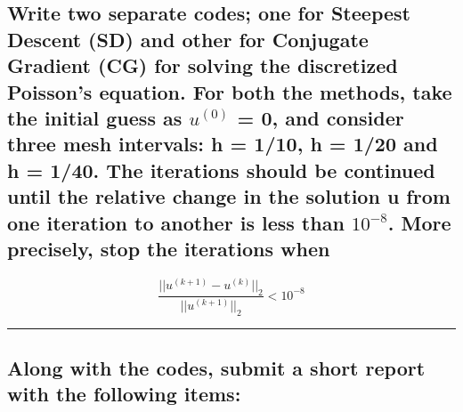 \documentclass[11pt]{article}
\begin{document}
    \hypertarget{write-two-separate-codes-one-for-steepest-descent-sd-and-other-for-conjugate-gradient-cg-for-solving-the-discretized-poissons-equation.-for-both-the-methods-take-the-initial-guess-as-u0-0-and-consider-three-mesh-intervals-h-110-h-120-and-h-140.-the-iterations-should-be-continued-until-the-relative-change-in-the-solution-u-from-one-iteration-to-another-is-less-than-10-8.-more-precisely-stop-the-iterations-when}{%
\subsection{\texorpdfstring{Write two separate codes; one for Steepest
Descent (SD) and other for Conjugate Gradient (CG) for solving the
discretized Poisson's equation. For both the methods, take the initial
guess as \(u^{(0)}\) = 0, and consider three mesh intervals: h = 1/10, h
= 1/20 and h = 1/40. The iterations should be continued until the
relative change in the solution u from one iteration to another is less
than \(10^{-8}\). More precisely, stop the iterations
when}{Write two separate codes; one for Steepest Descent (SD) and other for Conjugate Gradient (CG) for solving the discretized Poisson's equation. For both the methods, take the initial guess as u\^{}\{(0)\} = 0, and consider three mesh intervals: h = 1/10, h = 1/20 and h = 1/40. The iterations should be continued until the relative change in the solution u from one iteration to another is less than 10\^{}\{-8\}. More precisely, stop the iterations when}}\label{write-two-separate-codes-one-for-steepest-descent-sd-and-other-for-conjugate-gradient-cg-for-solving-the-discretized-poissons-equation.-for-both-the-methods-take-the-initial-guess-as-u0-0-and-consider-three-mesh-intervals-h-110-h-120-and-h-140.-the-iterations-should-be-continued-until-the-relative-change-in-the-solution-u-from-one-iteration-to-another-is-less-than-10-8.-more-precisely-stop-the-iterations-when}}

    \[\frac{||u^{(k+1)}-u^{(k)}||_2}{||u^{(k+1)}||_2} < 10^{-8} \tag{3}\]

    \begin{center}\rule{0.5\linewidth}{0.5pt}\end{center}

    \hypertarget{along-with-the-codes-submit-a-short-report-with-the-following-items}{%
\subsection{Along with the codes, submit a short report with the
following
items:}\label{along-with-the-codes-submit-a-short-report-with-the-following-items}}
\end{document}
